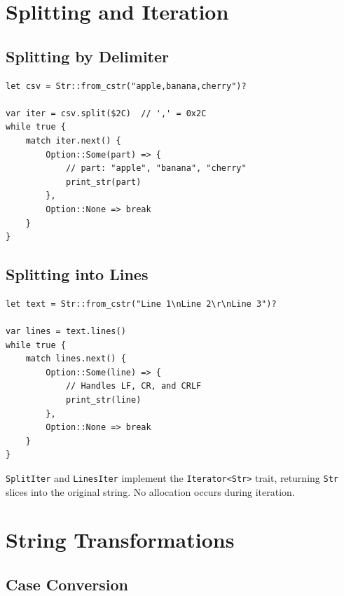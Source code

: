 \section{Splitting and Iteration}
\label{sec:string-iteration}

\subsection{Splitting by Delimiter}

\begin{lstlisting}
let csv = Str::from_cstr("apple,banana,cherry")?

var iter = csv.split($2C)  // ',' = 0x2C
while true {
    match iter.next() {
        Option::Some(part) => {
            // part: "apple", "banana", "cherry"
            print_str(part)
        },
        Option::None => break
    }
}
\end{lstlisting}

\subsection{Splitting into Lines}

\begin{lstlisting}
let text = Str::from_cstr("Line 1\nLine 2\r\nLine 3")?

var lines = text.lines()
while true {
    match lines.next() {
        Option::Some(line) => {
            // Handles LF, CR, and CRLF
            print_str(line)
        },
        Option::None => break
    }
}
\end{lstlisting}

\begin{notebox}
\texttt{SplitIter} and \texttt{LinesIter} implement the \texttt{Iterator<Str>} trait, returning \texttt{Str} slices into the original string. No allocation occurs during iteration.
\end{notebox}

\section{String Transformations}
\label{sec:string-transform}

\subsection{Case Conversion}

